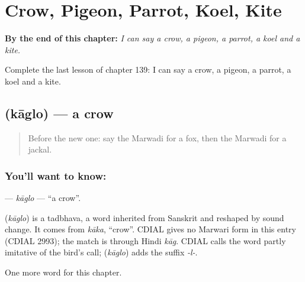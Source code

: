 
\chapter{Crow, Pigeon, Parrot, Koel, Kite}
\label{ch:mw-crow-pigeon-parrot-koel-kite}

\begin{chapteropening}
\textbf{By the end of this chapter:} \emph{I can say a crow, a pigeon, a parrot, a koel and a kite.}

Complete the last lesson of chapter 139: I can say a crow, a pigeon, a parrot, a koel and a kite.
\end{chapteropening}

\section[\texorpdfstring{\mw{कागलो} (kāglo)}{कागलो (kāglo)}]{ (kāglo) — a crow}

\label{lesson:MW-C139-kaglo}



\begin{quote}
Before the new one: say the Marwadi for a fox, then the Marwadi for a jackal.
\end{quote}

\subsection*{You'll want to know: }
\textbf{} — \emph{kāglo} — \textquotedblleft{}a crow\textquotedblright{}.

\begin{cousinweb}
\textbf{} (\emph{kāglo}) is a tadbhava, a word inherited from Sanskrit and reshaped by sound change. It comes from \emph{kāka}, \textquotedblleft{}crow\textquotedblright{}. CDIAL gives no Marwari form in this entry (CDIAL 2993); the match is through Hindi \emph{kāg}. CDIAL calls the word partly imitative of the bird's call; \textbf{} (\emph{kāglo}) adds the suffix \emph{-l-}.
\end{cousinweb}

\begin{grammarlens}[title={What you've built}]
One more word for this chapter.
\end{grammarlens}

